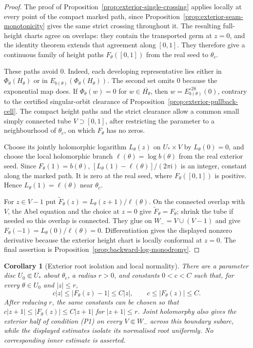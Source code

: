 \documentclass[11pt]{amsart}
\newtheorem{corollary}[theorem]{Corollary}
\theoremstyle{definition}
\newcommand{\ii}{\mathrm{i}}
\begin{document}
\begin{proof}
The proof of Proposition~\ref{prop:exterior-single-crossing} applies
locally at every point of the compact marked path, since
Proposition~\ref{prop:exterior-seam-monotonicity} gives the same
strict crossing throughout it.  The resulting full-height charts
agree on overlaps: they contain the transported germ at $z=0$,
and the identity theorem extends that agreement along $[0,1]$.
They therefore give a continuous family of height paths
$F_\theta([0,1])$ from the real seed to $\theta_c$.

These paths avoid $0$.  Indeed, each developing representative
lies either in $\Phi_\theta(H_\theta)$ or in
$E_{b(\theta)}(\Phi_\theta(H_\theta))$.
The second set omits $0$ because the exponential map does.
If $\Phi_\theta(w)=0$ for $w\in\overline{H_\theta}$, then
$w=E_{b(\theta)}^{\circ28}(0)$, contrary to the certified
singular-orbit clearance of
Proposition~\ref{prop:exterior-pullback-cell}.
The compact height paths and the strict clearance allow a common
small simply connected tube $V\supset[0,1]$, after restricting
the parameter to a neighbourhood of $\theta_c$, on which
$F_\theta$ has no zeros.

Choose its jointly holomorphic logarithm $L_\theta(z)$ on
$U_*\times V$ by $L_\theta(0)=0$, and choose the local
holomorphic branch $\ell(\theta)=\log b(\theta)$ from the real
exterior seed.  Since $F_\theta(1)=b(\theta)$,
$[L_\theta(1)-\ell(\theta)]/(2\pi\ii)$ is an integer, constant
along the marked path.  It is zero at the real seed, where
$F_\theta([0,1])$ is positive.  Hence $L_\theta(1)=\ell(\theta)$
near $\theta_c$.

For $z\in V-1$ put
$\widetilde F_\theta(z)=L_\theta(z+1)/\ell(\theta)$.
On the connected overlap with $V$, the Abel equation and the
choice at $z=0$ give $\widetilde F_\theta=F_\theta$;
shrink the tube if needed so this overlap is connected.
They glue on $W_-=V\cup(V-1)$ and give
$F_\theta(-1)=L_\theta(0)/\ell(\theta)=0$.
Differentiation gives the displayed nonzero derivative because
the exterior height chart is locally conformal at $z=0$.
The final assertion is
Proposition~\ref{prop:backward-log-monodromy}.
\end{proof}

\begin{corollary}[Exterior root isolation and local normality]
\label{cor:exterior-boundary-normal}
There are a parameter disc $U_0\Subset U_*$ about $\theta_c$,
a radius $r>0$, and constants $0<c<C$ such that, for every
$\theta\in U_0$ and $|z|\le r$,
\[
 c|z|\le |F_\theta(z)-1|\le C|z|,
 \qquad c\le |F_\theta(z)|\le C.
\]
After reducing $r$, the same constants can be chosen so that
$c|z+1|\le |F_\theta(z)|\le C|z+1|$ for $|z+1|\le r$.
Joint holomorphy also gives the exterior half of condition (P1)
on every $V\Subset W_-$ across this boundary subarc, while the
displayed estimates isolate its normalised root uniformly.
No corresponding inner estimate is asserted.
\end{corollary}
\end{document}
